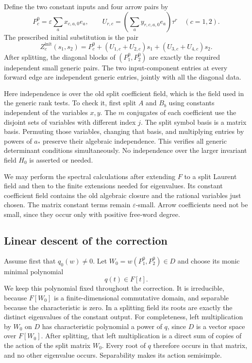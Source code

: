 \documentclass[11pt]{article}
\theoremstyle{definition}
\theoremstyle{remark}
\numberwithin{equation}{section}
\begin{document}
Define the two constant inputs and four arrow pairs by
\[
 P_c^0=\varepsilon\sum_a x_{c,a,0}e_a,
 \qquad
 U_{r,c}=\left(\sum_a y_{r,c,a,0}e_a\right)\tau^r
 \quad(c=1,2).
\]
The prescribed initial substitution is the pair
\begin{equation}
 Z_c^{\mathrm{init}}(s_1,s_2)
 =P_c^0+(U_{1,c}+U_{2,c})s_1
             +(U_{3,c}+U_{4,c})s_2.
 \label{eq:division-initial-input}
\end{equation}
After splitting, the diagonal blocks of $(P_1^0,P_2^0)$ are exactly
the required independent small generic pairs.  The two input-component
entries at every forward edge are independent generic entries, jointly
with all the diagonal data.

Here independence is over the old split coefficient field, which is the
field used in the generic rank tests.  To check it, first split $A$ and
$B_b$ using constants independent of the variables $x,y$.  The $m$
conjugates of each coefficient use the disjoint sets of variables with
different index $j$.  The split symbol basis is a matrix basis.
Permuting those variables, changing that basis, and multiplying entries
by powers of $a_*$ preserve their algebraic independence.  This verifies
all generic determinant conditions simultaneously.  No independence
over the larger invariant field $H_0$ is asserted or needed.

We may perform the spectral calculations after extending $F$ to a
split Laurent field and then to the finite extensions needed for
eigenvalues.  Its constant coefficient field contains the old algebraic
closure and the rational variables just chosen.  The matrix constant
terms remain $\varepsilon$-small.  Arrow coefficients need not be
small, since they occur only with positive free-word degree.

\subsection{Linear descent of the correction}

Assume first that $q_0(w)\ne0$.  Let $W_0=w(P_1^0,P_2^0)\in D$
and choose its monic minimal polynomial
\begin{equation}
 q(t)\in F[t].
 \label{eq:fixed-central-polynomial}
\end{equation}
We keep this polynomial fixed throughout the correction.  It is
irreducible, because $F[W_0]$ is a finite-dimensional commutative
domain, and separable because the characteristic is zero.  In a
splitting field its roots are exactly the distinct eigenvalues of the
constant output.  For completeness, left multiplication by $W_0$ on
$D$ has characteristic polynomial a power of $q$, since $D$ is a
vector space over $F[W_0]$.  After splitting, that left multiplication
is a direct sum of copies of the action of the split matrix $W_0$.
Every root of $q$ therefore occurs in that matrix, and no other
eigenvalue occurs.  Separability makes its action semisimple.
\end{document}
